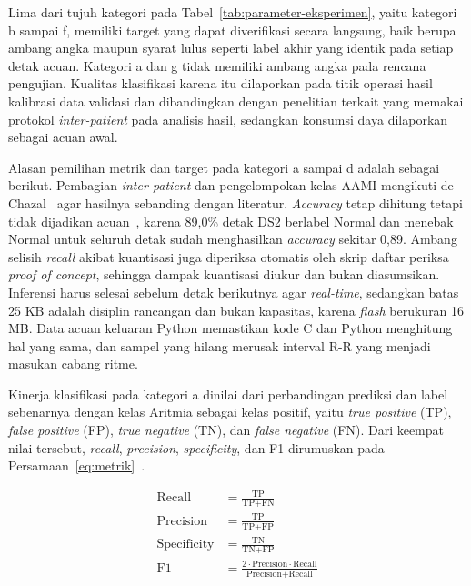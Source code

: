 Lima dari tujuh kategori pada Tabel~\ref{tab:parameter-eksperimen}, yaitu kategori b sampai f, memiliki target yang dapat diverifikasi secara langsung, baik berupa ambang angka maupun syarat lulus seperti label akhir yang identik pada setiap detak acuan. Kategori a dan g tidak memiliki ambang angka pada rencana pengujian. Kualitas klasifikasi karena itu dilaporkan pada titik operasi hasil kalibrasi data validasi dan dibandingkan dengan penelitian terkait yang memakai protokol \textit{inter-patient} pada analisis hasil, sedangkan konsumsi daya dilaporkan sebagai acuan awal.

Alasan pemilihan metrik dan target pada kategori a sampai d adalah sebagai berikut. Pembagian \textit{inter-patient} dan pengelompokan kelas AAMI mengikuti de Chazal~\cite{aami_ec57_2012, dechazal_2004} agar hasilnya sebanding dengan literatur. \textit{Accuracy} tetap dihitung tetapi tidak dijadikan acuan~\cite{chicco_2020}, karena 89,0\% detak DS2 berlabel Normal dan menebak Normal untuk seluruh detak sudah menghasilkan \textit{accuracy} sekitar 0,89. Ambang selisih \textit{recall} akibat kuantisasi juga diperiksa otomatis oleh skrip daftar periksa \textit{proof of concept}, sehingga dampak kuantisasi diukur dan bukan diasumsikan. Inferensi harus selesai sebelum detak berikutnya agar \textit{real-time}, sedangkan batas 25 KB adalah disiplin rancangan dan bukan kapasitas, karena \textit{flash} berukuran 16 MB. Data acuan keluaran Python memastikan kode C dan Python menghitung hal yang sama, dan sampel yang hilang merusak interval R-R yang menjadi masukan cabang ritme.

Kinerja klasifikasi pada kategori a dinilai dari perbandingan prediksi dan label sebenarnya dengan kelas Aritmia sebagai kelas positif, yaitu \textit{true positive} (TP), \textit{false positive} (FP), \textit{true negative} (TN), dan \textit{false negative} (FN). Dari keempat nilai tersebut, \textit{recall}, \textit{precision}, \textit{specificity}, dan F1 dirumuskan pada Persamaan~\ref{eq:metrik}~\cite{chicco_2020}.

\begin{align}
\text{Recall} &= \frac{\text{TP}}{\text{TP} + \text{FN}} \nonumber \\
\text{Precision} &= \frac{\text{TP}}{\text{TP} + \text{FP}} \nonumber \\
\text{Specificity} &= \frac{\text{TN}}{\text{TN} + \text{FP}} \nonumber \\
\text{F1} &= \frac{2 \cdot \text{Precision} \cdot \text{Recall}}{\text{Precision} + \text{Recall}}
\label{eq:metrik}
\end{align}

